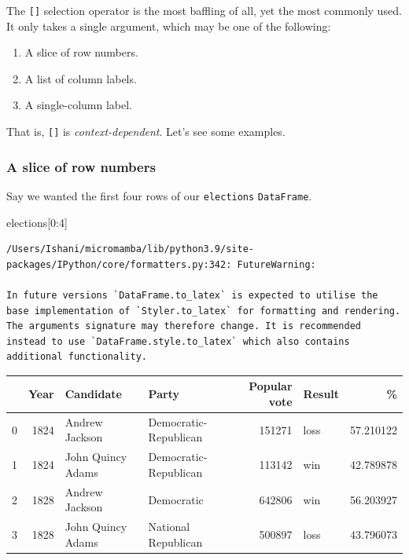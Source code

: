 \documentclass[
  letterpaper,
  DIV=11,
  numbers=noendperiod]{scrreprt}
\newenvironment{Shaded}{\begin{snugshade}}{\end{snugshade}}
\newcommand{\DecValTok}[1]{\textcolor[rgb]{0.68,0.00,0.00}{#1}}
\newcommand{\NormalTok}[1]{\textcolor[rgb]{0.00,0.23,0.31}{#1}}
\providecommand{\tightlist}{%
  \setlength{\itemsep}{0pt}\setlength{\parskip}{0pt}}\usepackage{longtable,booktabs,array}
\begin{document}
The \texttt{{[}{]}} selection operator is the most baffling of all, yet
the most commonly used. It only takes a single argument, which may be
one of the following:

\begin{enumerate}
\def\labelenumi{\arabic{enumi}.}
\tightlist
\item
  A slice of row numbers.
\item
  A list of column labels.
\item
  A single-column label.
\end{enumerate}

That is, \texttt{{[}{]}} is \emph{context-dependent}. Let's see some
examples.

\hypertarget{a-slice-of-row-numbers}{%
\subsubsection{A slice of row numbers}\label{a-slice-of-row-numbers}}

Say we wanted the first four rows of our \texttt{elections}
\texttt{DataFrame}.

\begin{Shaded}
\begin{Highlighting}[]
\NormalTok{elections[}\DecValTok{0}\NormalTok{:}\DecValTok{4}\NormalTok{]}
\end{Highlighting}
\end{Shaded}

\begin{verbatim}
/Users/Ishani/micromamba/lib/python3.9/site-packages/IPython/core/formatters.py:342: FutureWarning:

In future versions `DataFrame.to_latex` is expected to utilise the base implementation of `Styler.to_latex` for formatting and rendering. The arguments signature may therefore change. It is recommended instead to use `DataFrame.style.to_latex` which also contains additional functionality.
\end{verbatim}

\begin{tabular}{lrllrlr}
\toprule
{} &  Year &          Candidate &                  Party &  Popular vote & Result &          \% \\
\midrule
0 &  1824 &     Andrew Jackson &  Democratic-Republican &        151271 &   loss &  57.210122 \\
1 &  1824 &  John Quincy Adams &  Democratic-Republican &        113142 &    win &  42.789878 \\
2 &  1828 &     Andrew Jackson &             Democratic &        642806 &    win &  56.203927 \\
3 &  1828 &  John Quincy Adams &    National Republican &        500897 &   loss &  43.796073 \\
\bottomrule
\end{tabular}
\end{document}
